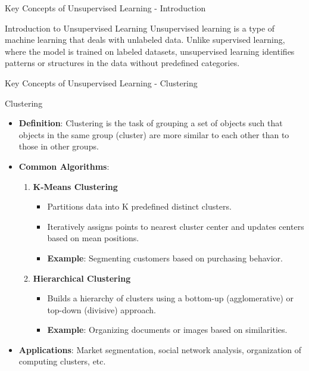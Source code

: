 \documentclass[aspectratio=169]{beamer}
\begin{document}
\begin{frame}[fragile]{Key Concepts of Unsupervised Learning - Introduction}
    \begin{block}{Introduction to Unsupervised Learning}
        Unsupervised learning is a type of machine learning that deals with unlabeled data. Unlike supervised learning, where the model is trained on labeled datasets, unsupervised learning identifies patterns or structures in the data without predefined categories.
    \end{block}
\end{frame}

\begin{frame}[fragile]{Key Concepts of Unsupervised Learning - Clustering}
    \begin{block}{Clustering}
        \begin{itemize}
            \item \textbf{Definition}: Clustering is the task of grouping a set of objects such that objects in the same group (cluster) are more similar to each other than to those in other groups.
            \item \textbf{Common Algorithms}:
                \begin{enumerate}
                    \item \textbf{K-Means Clustering}
                        \begin{itemize}
                            \item Partitions data into K predefined distinct clusters.
                            \item Iteratively assigns points to nearest cluster center and updates centers based on mean positions.
                            \item \textbf{Example}: Segmenting customers based on purchasing behavior.
                        \end{itemize}
                    \item \textbf{Hierarchical Clustering}
                        \begin{itemize}
                            \item Builds a hierarchy of clusters using a bottom-up (agglomerative) or top-down (divisive) approach.
                            \item \textbf{Example}: Organizing documents or images based on similarities.
                        \end{itemize}
                \end{enumerate}
            \item \textbf{Applications}: Market segmentation, social network analysis, organization of computing clusters, etc.
        \end{itemize}
    \end{block}
\end{frame}
\end{document}
